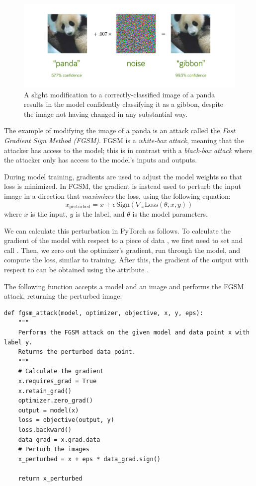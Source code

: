 \begin{figure}[H] %
\centering

 	\includegraphics[width=\textwidth]{figures/panda.png}   
    \caption{A slight modification to a correctly-classified image of a panda results in the model confidently classifying it as a gibbon, despite the image not having changed in any substantial way.}
\end{figure}

The example of modifying the image of a panda is an attack called the \emph{Fast Gradient Sign Method (FGSM)}. 
FGSM is a \emph{white-box attack}, meaning that the attacker has access to the model; this is in contrast with a \emph{black-box attack} where the attacker only has access to the model's inputs and outputs.

During model training, gradients are used to adjust the model weights so that loss is minimized.
In FGSM, the gradient is instead used to perturb the input image in a direction that \emph{maximizes} the loss, using the following equation:
\begin{equation*}
x_\text{perturbed} = x + \epsilon\, \mathrm{Sign}(\nabla_x \mathrm{Loss}(\theta, x, y))
\end{equation*}
where $x$ is the input, $y$ is the label, and $\theta$ is the model parameters.


We can calculate this perturbation in PyTorch as follows.
To calculate the gradient of the model with respect to a piece of data , we first need to set  and call . %
Then, we zero out the optimizer's gradient, run  through the model, and compute the loss, similar to training.
After this, the gradient of the output with respect to  can be obtained using the attribute .

The following function  accepts a model and an image and performs the FGSM attack, returning the perturbed image:
\begin{lstlisting}
def fgsm_attack(model, optimizer, objective, x, y, eps):
    """
    Performs the FGSM attack on the given model and data point x with label y.
    Returns the perturbed data point.
    """
    # Calculate the gradient
    x.requires_grad = True
    x.retain_grad()
    optimizer.zero_grad()
    output = model(x)
    loss = objective(output, y)
    loss.backward()
    data_grad = x.grad.data
    # Perturb the images
    x_perturbed = x + eps * data_grad.sign()
    
    return x_perturbed
\end{lstlisting}

